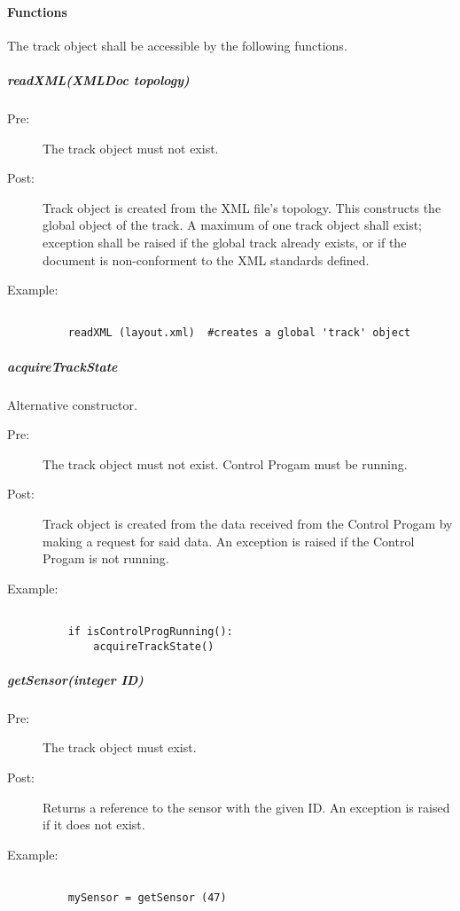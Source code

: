 \documentclass[a4paper,11pt,notitlepage]{article}
\def\CS{Control Progam\xspace}
\begin{document}
\paragraph{Functions}
The track object shall be accessible by the following functions.

\subparagraph{readXML(XMLDoc topology)}
\begin{description}
\item[\hspace{1cm}Pre:] The track object must not exist.
\item[\hspace{1cm}Post:] Track object is created from the XML file's topology. This constructs the global object of the track. A maximum of one track object shall exist; exception shall be raised if the global track already exists, or if the document is non-conforment to the XML standards defined.
\item[\hspace{1cm}Example:]
\begin{verbatim}

    readXML (layout.xml)  #creates a global 'track' object
\end{verbatim}
\end{description}

\subparagraph{acquireTrackState} Alternative constructor.
\begin{description}
\item[\hspace{1cm}Pre:] The track object must not exist. \CS must be running.
\item[\hspace{1cm}Post:] Track object is created from the data received from the \CS by making a request for said data. An exception is raised if the \CS is not running.
\item[\hspace{1cm}Example:]
\begin{verbatim}

    if isControlProgRunning():
        acquireTrackState()
\end{verbatim}
\end{description}

\subparagraph{getSensor(integer ID)}
\begin{description}
\item[\hspace{1cm}Pre:] The track object must exist.
\item[\hspace{1cm}Post:] Returns a reference to the sensor with the given ID. An exception is raised if it does not exist.
\item[\hspace{1cm}Example:]
\begin{verbatim}

    mySensor = getSensor (47)
\end{verbatim}
\end{description}
\end{document}
